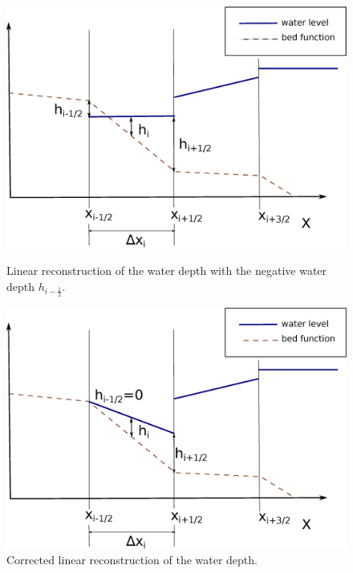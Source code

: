 \begin{figure}[t]
\centering
\begin{minipage}[t]{0.44\textwidth}
\begin{center}
\includegraphics[width=1\textwidth]{OBR/negW.eps}
\caption{Linear reconstruction of the water depth with the negative water depth $h_{i-\frac12}$.}\label{negW}
\end{center}
\end{minipage}\hspace{15mm}
\begin{minipage}[t]{0.44\textwidth}
\begin{center}
\includegraphics[width=1\textwidth]{OBR/zeroW}
\caption{Corrected linear reconstruction of the water depth.}\label{zeroW}
\end{center}
\end{minipage}
\end{figure}	
